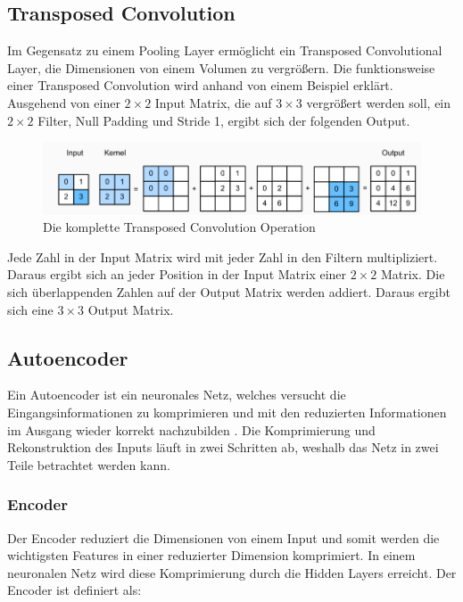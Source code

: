 \subsection{Transposed Convolution}
Im Gegensatz zu einem Pooling Layer ermöglicht ein Transposed Convolutional Layer, die Dimensionen von einem Volumen zu vergrößern. 
Die funktionsweise einer Transposed Convolution wird anhand von einem Beispiel erklärt. 
\\
Ausgehend von einer $ 2 \times 2 $ Input Matrix, die auf $ 3 \times 3 $ vergrößert werden soll, ein $ 2 \times 2 $ Filter, 
Null Padding und Stride 1, ergibt sich der folgenden Output. 

\begin{figure}[H]
  \centering
  \includegraphics[width=1\textwidth]{resources/cnn/transposed-conv.png}
  \caption{
    Die komplette Transposed Convolution Operation
    \cite{zhang2020dive}
  }
  \label{image:transposed-conv}
\end{figure}

Jede Zahl in der Input Matrix wird mit jeder Zahl in den Filtern multipliziert. Daraus ergibt sich an jeder Position in der Input Matrix einer 
$ 2 \times 2 $ Matrix. Die sich überlappenden Zahlen auf der Output Matrix werden addiert. Daraus ergibt sich eine $ 3 \times 3 $ Output Matrix.

\subsection{Autoencoder}
Ein Autoencoder ist ein neuronales Netz, welches versucht die Eingangsinformationen zu komprimieren und mit den reduzierten Informationen 
im Ausgang wieder korrekt nachzubilden \cite{was-ist-autoencoder}. Die Komprimierung und Rekonstruktion des Inputs läuft in zwei Schritten ab, 
weshalb das Netz in zwei Teile betrachtet werden kann.
\\
\subsubsection{Encoder}
Der Encoder reduziert die Dimensionen von einem Input und somit werden die wichtigsten Features in einer reduzierter Dimension komprimiert.
In einem neuronalen Netz wird diese Komprimierung durch die Hidden Layers erreicht. Der Encoder ist definiert als:

